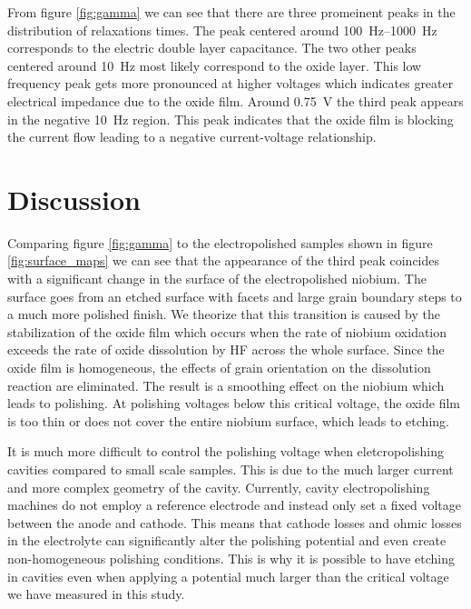 \documentclass[11pt]{article}
\begin{document}
From figure \ref{fig:gamma} we can see that there are three promeinent peaks in the distribution of relaxations times. The peak centered around \qtyrange{100}{1000}{\hertz} corresponds to the electric double layer capacitance. The two other peaks centered around \qty{10}{\hertz} most likely correspond to the oxide layer. This low frequency peak gets more pronounced at higher voltages which indicates greater electrical impedance due to the oxide film. Around \qty{0.75}{\volt} the third peak appears in the negative \qty{10}{\hertz} region. This peak indicates that the oxide film is blocking the current flow leading to a negative current-voltage relationship.



\section{Discussion}

Comparing figure \ref{fig:gamma} to the electropolished samples shown in figure \ref{fig:surface_maps} we can see that the appearance of the third peak coincides with a significant change in the surface of the electropolished niobium. The surface goes from an etched surface with facets and large grain boundary steps to a much more polished finish. We theorize that this transition is caused by the stabilization of the oxide film which occurs when the rate of niobium oxidation exceeds the rate of oxide dissolution by HF across the whole surface. Since the oxide film is homogeneous, the effects of grain orientation on the dissolution reaction are eliminated. The result is a smoothing effect on the niobium which leads to polishing. At polishing voltages below this critical voltage, the oxide film is too thin or does not cover the entire niobium surface, which leads to etching.

It is much more difficult to control the polishing voltage when eletcropolishing cavities compared to small scale samples. This is due to the much larger current and more complex geometry of the cavity. Currently, cavity electropolishing machines do not employ a reference electrode and instead only set a fixed voltage between the anode and cathode. This means that cathode losses and ohmic losses in the electrolyte can significantly alter the polishing potential and even create non-homogeneous polishing conditions. This is why it is possible to have etching in cavities even when applying a potential much larger than the critical voltage we have measured in this study.
\end{document}
